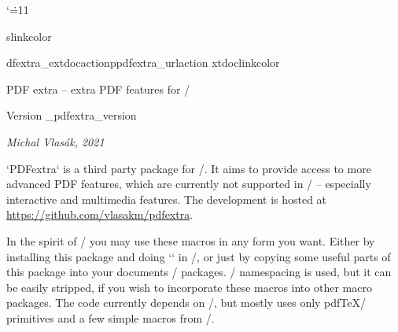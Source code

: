 \catcode`\.=11

\newcount\tnotenum
\def\tnotelist{}
\def\tnote#1{\incr\tnotenum $^{\rm\_romannumeral\tnotenum}$\global\addto\tnotelist{{#1}}}
\def\tnoteprint{\typoscale[920/920]\par \tnotenum=0
   \ea\foreach\tnotelist
     \do{\advance\tnotenum by1 \par $^{\rm\_romannumeral\tnotenum}$##1 }\par
   \global\tnotenum=0 \gdef\tnotelist{}%
}

\let\_cslinkcolor\Blue

\let\_pdfextra_extdocaction\_pdfextra_urlaction
\let\_extdoclinkcolor\Blue
\def\_Xindex#1#2{\sdef{,#1}{}\slet{el:#1}{optexdoclink}}
\def\optexdoclink{\hlink[extdoc:\optexdocurl\#cs:\_tmpa]{\csstring\\\_tmpb}}
\def\optexdocurl{http://petr.olsak.net/ftp/olsak/optex/optex-doc.pdf}
\iftrue \fi

\def\Xeref#1{\sdef{,#1}{}\slet{el:#1}{texdoclink}}
\def\texdoclink{\hlink[extdoc:\texdocurl\#cs:\_tmpa]{\csstring\\\_tmpb}}
\def\texdocurl{http://petr.olsak.net/ftp/olsak/optex/tex-nutshell.pdf}
\iftrue \fi


\tit PDF extra -- extra PDF features for \OpTeX/

\hfill Version \_pdfextra_version

\centerline{\it Michal Vlasák, 2021}
\bigskip

\noindent
`PDFextra` is a third party package for \OpTeX/. It aims to provide access to
more advanced PDF features, which are currently not supported in \OpTeX/ --
especially interactive and multimedia features. The development is hosted at
\url{https://github.com/vlasakm/pdfextra}.

In the spirit of \OpTeX/ you may use these macros in any form you want. Either
by installing this package and doing `\load[pdfextra]` in \OpTeX/, or just by
copying some useful parts of this package into your documents / packages.
\OpTeX/ namespacing is used, but it can be easily stripped, if you wish to
incorporate these macros into other macro packages. The code currently depends
on \LuaTeX/, but mostly uses only pdf\TeX/ primitives and a few simple macros
from \OpTeX/.

